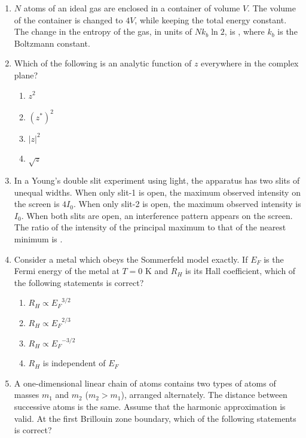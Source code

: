 \documentclass[journal,12pt,onecolumn]{IEEEtran}
\theoremstyle{remark}
\begin{document}
\begin{enumerate}
\item $N$ atoms of an ideal gas are enclosed in a container of volume $V$. The volume of the container is changed to $4V$, while keeping the total energy constant. The change in the entropy of the gas, in units of $N k_b \ln 2$, is \underline{\hspace{2cm}}, where $k_b$ is the Boltzmann constant.

\item Which of the following is an analytic function of $z$ everywhere in the complex plane?

\begin{multicols}{4}
\begin{enumerate}
    \item $z^2$
    \item $(z^*)^2$
    \item $|z|^2$
    \item $\sqrt{z}$
\end{enumerate}
\end{multicols}

\item In a Young's double slit experiment using light, the apparatus has two slits of unequal widths. When only slit-1 is open, the maximum observed intensity on the screen is $4I_0$. When only slit-2 is open, the maximum observed intensity is $I_0$. When both slits are open, an interference pattern appears on the screen. The ratio of the intensity of the principal maximum to that of the nearest minimum is \underline{\hspace{2cm}}.

\item Consider a metal which obeys the Sommerfeld model exactly. If $E_F$ is the Fermi energy of the metal at $T = 0$ K and $R_H$ is its Hall coefficient, which of the following statements is correct?

\begin{multicols}{4}
\begin{enumerate}
    \item $R_H \propto {E_F}^{3/2}$
    \item $R_H \propto {E_F}^{2/3}$
    \item $R_H \propto {E_F}^{-3/2}$
    \item $R_H$ is independent of $E_F$
\end{enumerate}
\end{multicols}

\item A one-dimensional linear chain of atoms contains two types of atoms of masses $m_1$ and $m_2$ ($m_2 > m_1$), arranged alternately. The distance between successive atoms is the same. Assume that the harmonic approximation is valid. At the first Brillouin zone boundary, which of the following statements is correct?


\end{enumerate}
\end{document}
